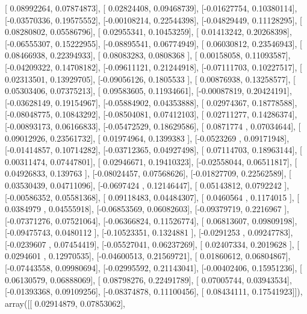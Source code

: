 \documentclass{article}
\begin{document}
       [ 0.08992264,  0.07874873],
       [ 0.02824408,  0.09468739],
       [-0.01627754,  0.10380114],
       [-0.03570336,  0.19575552],
       [-0.00108214,  0.22544398],
       [-0.04829449,  0.11128295],
       [ 0.08280802,  0.05586796],
       [ 0.02955341,  0.10453259],
       [ 0.01413242,  0.20268398],
       [-0.06555307,  0.15222955],
       [-0.08895541,  0.06774949],
       [ 0.06030812,  0.23546943],
       [ 0.08466938,  0.22394933],
       [ 0.08083283,  0.0808368 ],
       [ 0.00158058,  0.11093587],
       [-0.04209322,  0.14708182],
       [-0.09611121,  0.21244918],
       [-0.07111703,  0.10227517],
       [ 0.02313501,  0.13929705],
       [-0.09056126,  0.1805533 ],
       [ 0.00876938,  0.13258577],
       [ 0.05303406,  0.07375213],
       [ 0.09583605,  0.11934661],
       [-0.00087819,  0.20424191],
       [-0.03628149,  0.19154967],
       [-0.05884902,  0.04353888],
       [ 0.02974367,  0.18778588],
       [-0.08048775,  0.10843292],
       [-0.08504081,  0.07412103],
       [ 0.02711277,  0.14286374],
       [-0.00893173,  0.06166833],
       [-0.05472529,  0.18629586],
       [ 0.0871774 ,  0.07034644],
       [ 0.09012926,  0.23561732],
       [ 0.01974964,  0.1399383 ],
       [-0.0523269 ,  0.09171948],
       [-0.01414857,  0.10714282],
       [-0.03712365,  0.04927498],
       [ 0.07114703,  0.18963144],
       [ 0.00311474,  0.07447801],
       [ 0.02946671,  0.19410323],
       [-0.02558044,  0.06511817],
       [ 0.04926833,  0.139763  ],
       [-0.08024457,  0.07568626],
       [-0.01827709,  0.22562589],
       [ 0.03530439,  0.04711096],
       [-0.0697424 ,  0.12146447],
       [ 0.05143812,  0.0792242 ],
       [-0.00586352,  0.05581368],
       [ 0.09118483,  0.04484307],
       [ 0.0460564 ,  0.1174015 ],
       [ 0.0384979 ,  0.04555918],
       [-0.06853569,  0.06082603],
       [-0.09379719,  0.2216967 ],
       [-0.07371276,  0.07521064],
       [-0.06366824,  0.11526774],
       [ 0.06813607,  0.09809198],
       [-0.09475743,  0.0480112 ],
       [-0.10523351,  0.1324881 ],
       [-0.0291253 ,  0.09247783],
       [-0.0239607 ,  0.07454419],
       [-0.05527041,  0.06237269],
       [ 0.02407334,  0.2019628 ],
       [ 0.0294601 ,  0.12970535],
       [-0.04600513,  0.21569721],
       [ 0.01860612,  0.06804867],
       [-0.07443558,  0.09980694],
       [-0.02995592,  0.21143041],
       [-0.00402406,  0.15951236],
       [ 0.06130579,  0.06888069],
       [ 0.08798276,  0.22491789],
       [ 0.07005744,  0.03943534],
       [-0.01393368,  0.09109256],
       [-0.08374878,  0.11100456],
       [ 0.08434111,  0.17541923]]), array([[ 0.02914879,  0.07853062],
\end{document}
